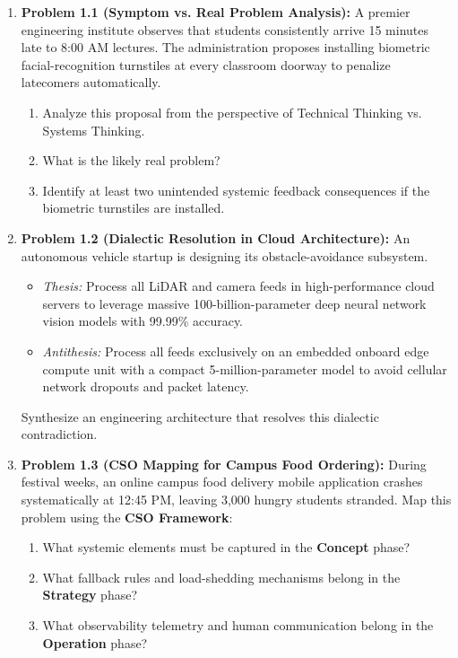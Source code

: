 \begin{enumerate}[leftmargin=2em]
    \item \textbf{Problem 1.1 (Symptom vs. Real Problem Analysis):}
    A premier engineering institute observes that students consistently arrive 15 minutes late to 8:00 AM lectures. The administration proposes installing biometric facial-recognition turnstiles at every classroom doorway to penalize latecomers automatically.
    \begin{enumerate}[label=(\alph*)]
        \item Analyze this proposal from the perspective of Technical Thinking vs. Systems Thinking.
        \item What is the likely real problem?
        \item Identify at least two unintended systemic feedback consequences if the biometric turnstiles are installed.
    \end{enumerate}

    \item \textbf{Problem 1.2 (Dialectic Resolution in Cloud Architecture):}
    An autonomous vehicle startup is designing its obstacle-avoidance subsystem.
    \begin{itemize}
        \item \textit{Thesis:} Process all LiDAR and camera feeds in high-performance cloud servers to leverage massive 100-billion-parameter deep neural network vision models with 99.99\% accuracy.
        \item \textit{Antithesis:} Process all feeds exclusively on an embedded onboard edge compute unit with a compact 5-million-parameter model to avoid cellular network dropouts and packet latency.
    \end{itemize}
    Synthesize an engineering architecture that resolves this dialectic contradiction.

    \item \textbf{Problem 1.3 (CSO Mapping for Campus Food Ordering):}
    During festival weeks, an online campus food delivery mobile application crashes systematically at 12:45 PM, leaving 3,000 hungry students stranded. Map this problem using the \textbf{CSO Framework}:
    \begin{enumerate}[label=(\alph*)]
        \item What systemic elements must be captured in the \textbf{Concept} phase?
        \item What fallback rules and load-shedding mechanisms belong in the \textbf{Strategy} phase?
        \item What observability telemetry and human communication belong in the \textbf{Operation} phase?
    \end{enumerate}
\end{enumerate}

